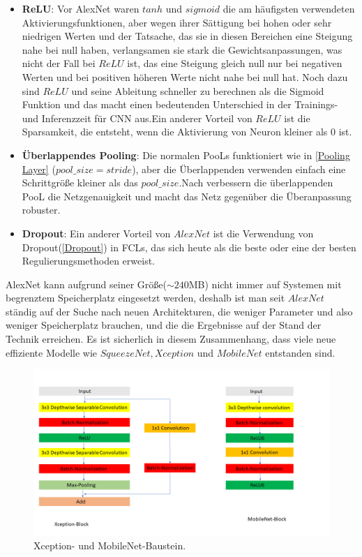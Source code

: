 \documentclass[12pt,a4paper]{scrartcl}
\numberwithin{equation}{section}
\begin{document}
\begin{itemize}
	\item \textbf{ReLU}: Vor AlexNet waren $ tanh $ und $ sigmoid $ die am häufigsten verwendeten Aktivierungsfunktionen, aber wegen ihrer Sättigung bei hohen oder sehr niedrigen Werten und der Tatsache, das sie in diesen Bereichen eine Steigung nahe bei null haben, verlangsamen sie stark die Gewichtsanpassungen, was nicht der Fall bei $ ReLU $ ist, das eine Steigung gleich null nur bei negativen Werten und bei positiven höheren Werte  nicht nahe bei null hat. Noch dazu sind $ ReLU $ und seine Ableitung schneller zu berechnen als die Sigmoid Funktion und das macht einen bedeutenden Unterschied in der Trainings- und Inferenzzeit für CNN aus.Ein anderer Vorteil von $ ReLU $ ist die Sparsamkeit, die entsteht, wenn die Aktivierung von Neuron kleiner als 0 ist.
	
	\item \textbf{Überlappendes Pooling}: Die normalen \acsp{PooL} funktioniert wie in \ref{Pooling Layer} ($ pool\_size = stride$), aber die Überlappenden verwenden einfach eine Schrittgröße kleiner als das $ pool\_size $.Nach \cite{AlexNet} verbessern die überlappenden \ac{PooL}  die Netzgenauigkeit und macht das Netz gegenüber die Überanpassung robuster.
	\item \textbf{Dropout}: Ein anderer Vorteil von $ AlexNet $ ist die Verwendung von Dropout(\ref{Dropout}) in \acsp{FCL}, das sich heute als die beste oder eine der besten Regulierungsmethoden erweist.
\end{itemize}



AlexNet kann aufgrund seiner Größe($\sim240$MB) nicht immer auf Systemen mit begrenztem Speicherplatz eingesetzt werden, deshalb ist man seit $ AlexNet $ ständig auf der Suche nach neuen Architekturen, die weniger Parameter und also weniger Speicherplatz brauchen, und die die Ergebnisse auf der Stand der Technik erreichen. Es ist sicherlich  in diesem Zusammenhang, dass viele neue effiziente Modelle wie $SqueezeNet, Xception $ und $ MobileNet $ entstanden sind.

\begin{figure}[h!]
	\centering
	\includegraphics[width=\textwidth ]{Convolution/Folie3}
	\caption{Xception- und MobileNet-Baustein.}
	\label{fig:Xception|MobileNet}
\end{figure}
\end{document}
